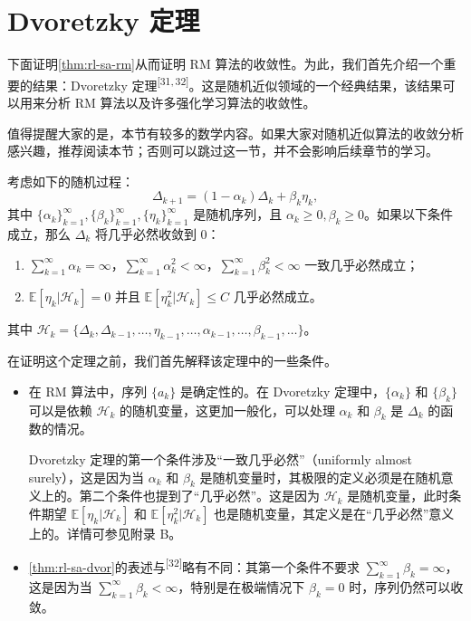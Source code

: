 \section{Dvoretzky 定理}
\label{sec:rl-sa-dvor}

下面证明\cref{thm:rl-sa-rm}从而证明 RM 算法的收敛性。为此，我们首先介绍一个重要的结果：Dvoretzky 定理\textsuperscript{[31,\,32]}。这是随机近似领域的一个经典结果，该结果可以用来分析 RM 算法以及许多强化学习算法的收敛性。

值得提醒大家的是，本节有较多的数学内容。如果大家对随机近似算法的收敛分析感兴趣，推荐阅读本节；否则可以跳过这一节，并不会影响后续章节的学习。

\begin{theorem}[Dvoretzky 定理]\label{thm:rl-sa-dvor}
考虑如下的随机过程：
\begin{equation}
\Delta_{k+1} = (1 - \alpha_k) \Delta_k + \beta_k \eta_k,
\end{equation}
其中 $\{\alpha_k\}_{k=1}^{\infty}, \{\beta_k\}_{k=1}^{\infty}, \{\eta_k\}_{k=1}^{\infty}$ 是随机序列，且 $\alpha_k \geqslant 0, \beta_k \geqslant 0$。如果以下条件成立，那么 $\Delta_k$ 将几乎必然收敛到 0：
\begin{enumerate}
  \item[(a)] $\sum_{k=1}^{\infty} \alpha_k = \infty$，$\sum_{k=1}^{\infty} \alpha_k^2 < \infty$，$\sum_{k=1}^{\infty} \beta_k^2 < \infty$ 一致几乎必然成立；
  \item[(b)] $\mathbb{E}[\eta_k | \mathcal{H}_k] = 0$ 并且 $\mathbb{E}[\eta_k^2 | \mathcal{H}_k] \leqslant C$ 几乎必然成立。
\end{enumerate}
其中 $\mathcal{H}_k = \{\Delta_k, \Delta_{k-1}, \dots, \eta_{k-1}, \dots, \alpha_{k-1}, \dots, \beta_{k-1}, \dots\}$。
\end{theorem}

在证明这个定理之前，我们首先解释该定理中的一些条件。

\begin{itemize}
  \item 在 RM 算法中，序列 $\{a_k\}$ 是确定性的。在 Dvoretzky 定理中，$\{\alpha_k\}$ 和 $\{\beta_k\}$ 可以是依赖 $\mathcal{H}_k$ 的随机变量，这更加一般化，可以处理 $\alpha_k$ 和 $\beta_k$ 是 $\Delta_k$ 的函数的情况。

  Dvoretzky 定理的第一个条件涉及“一致几乎必然”（uniformly almost surely），这是因为当 $\alpha_k$ 和 $\beta_k$ 是随机变量时，其极限的定义必须是在随机意义上的。第二个条件也提到了“几乎必然”。这是因为 $\mathcal{H}_k$ 是随机变量，此时条件期望 $\mathbb{E}[\eta_k | \mathcal{H}_k]$ 和 $\mathbb{E}[\eta_k^2 | \mathcal{H}_k]$ 也是随机变量，其定义是在“几乎必然”意义上的。详情可参见附录 B。

  \item \cref{thm:rl-sa-dvor}的表述与\textsuperscript{[32]}略有不同：其第一个条件不要求 $\sum_{k=1}^{\infty} \beta_k = \infty$，这是因为当 $\sum_{k=1}^{\infty} \beta_k < \infty$，特别是在极端情况下 $\beta_k = 0$ 时，序列仍然可以收敛。
\end{itemize}

